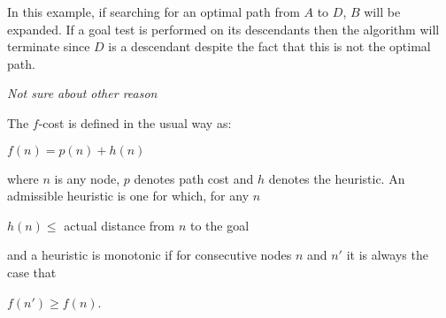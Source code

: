 \documentclass{supervision}
\begin{document}
\begin{questions}
\begin{solution}
        In this example, if searching for an optimal path from $A$ to $D$, $B$
        will be expanded. If a goal test is performed on its descendants then
        the algorithm will terminate since $D$ is a descendant despite the fact
        that this is not the optimal path.

        \emph{Not sure about other reason}
      \end{solution}

    \question The $f$-cost is defined in the usual way as:
      \begin{center}
        $f(n) = p(n) + h(n)$
      \end{center}

      where $n$ is any node, $p$ denotes path cost and $h$ denotes the
      heuristic. An admissible heuristic is one for which, for any $n$

      \begin{center}
        $h(n) \leq$ actual distance from $n$ to the goal
      \end{center}

      and a heuristic is monotonic if for consecutive nodes $n$ and $n'$ it is
      always the case that

      \begin{center}
        $f(n') \geq f(n)$.
      \end{center}

\end{questions}
\end{document}
